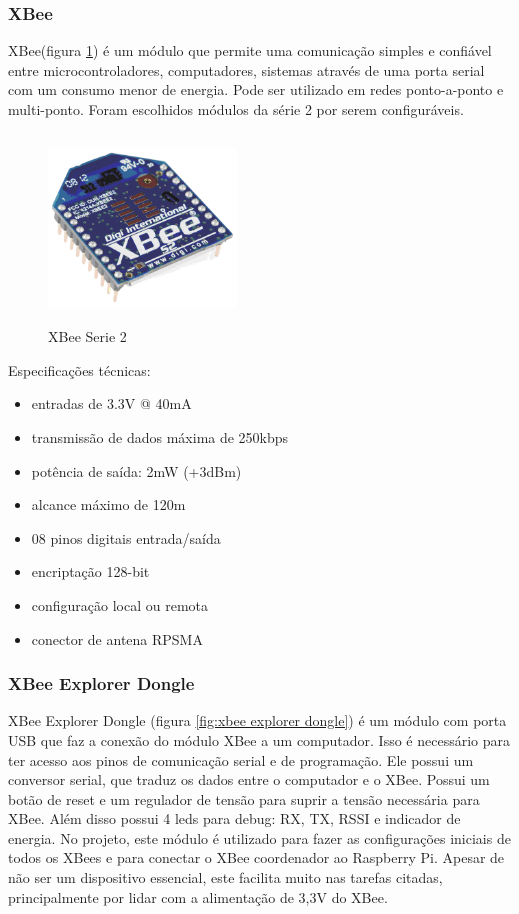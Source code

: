 \subsubsection{XBee}

XBee(figura \ref{fig:xbee}) é um módulo que permite uma comunicação simples e confiável entre microcontroladores, computadores, sistemas através de uma porta serial com um consumo menor de energia. Pode ser utilizado em redes ponto-a-ponto e multi-ponto. Foram escolhidos módulos da série 2 por serem configuráveis.

\begin{figure}[H]
\begin{center}
\includegraphics[width=5cm,height=5cm,keepaspectratio]{figuras/xbee_serie2.png}
\caption{\label{fig:xbee} XBee Serie 2}
\end{center}
\end{figure}

Especificações técnicas:
\begin{itemize}
\item{entradas de 3.3V @ 40mA}
\item{transmissão de dados máxima de 250kbps}
\item{potência de saída: 2mW (+3dBm)}
\item{alcance máximo de 120m}
\item{08 pinos digitais entrada/saída}
\item{encriptação 128-bit}
\item{configuração local ou remota}
\item{conector de antena RPSMA}
\end{itemize}
%
\subsubsection{XBee Explorer Dongle}

XBee Explorer Dongle (figura \ref{fig:xbee explorer dongle}) é um módulo com porta USB que faz a conexão do módulo XBee a um computador. Isso é necessário para ter acesso aos pinos de comunicação serial e de programação. Ele possui um conversor serial, que traduz os dados entre o computador e o XBee. Possui um botão de reset e um regulador de tensão para suprir a tensão necessária para XBee. Além disso possui 4 leds para debug: RX, TX, RSSI e indicador de energia. No projeto, este módulo é utilizado para fazer as configurações iniciais de todos os XBees e para conectar o XBee coordenador ao Raspberry Pi. Apesar de não ser um dispositivo essencial, este facilita muito nas tarefas citadas,  principalmente por lidar com a alimentação de 3,3V do XBee.

